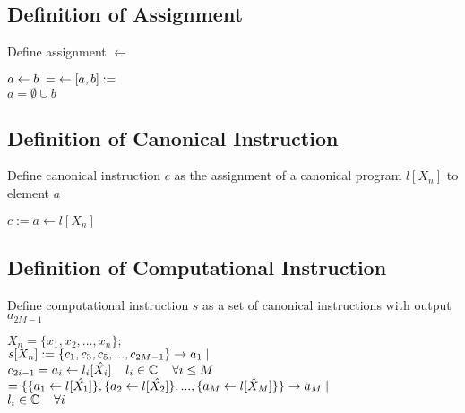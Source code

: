 \documentclass[11pt]{article}
\begin{document}
\subsection{Definition of Assignment}
Define assignment $\leftarrow$
\begin{center}
$
a \leftarrow b \hspace{1mm} = \hspace{1mm} \leftarrow[a,b] :=
$
\\ \vspace{2mm}
$
a = \emptyset \cup b
$
\end{center}





\subsection{Definition of Canonical Instruction}
Define canonical instruction $c$ as the assignment of a canonical program $l[X_n]$ to element $a$
\begin{center}
$
c := a \leftarrow l[X_n]
$
\end{center}








\subsection{Definition of Computational Instruction}
Define computational instruction $s$ as a set of canonical instructions with output $a_{2M-1}$
\begin{center}
\vspace{1mm}
$
X_n = \{x_1,x_2,...,x_n\};
$
\\ \vspace{6mm}
$
s[X_n] := \{c_1,c_3,c_5,...,c_{2M-1}\} \rightarrow a_{1} \hspace{1mm} |
$
\\ \vspace{3mm}
$
c_{2i -1}= a_i \leftarrow l_i[\hat{X_i}]  \hspace{4mm} l_i \in \mathbb{C} \hspace{4mm} \forall i \leq M
$
\\ \vspace{6mm}
$
= \{\{a_1 \leftarrow l[\hat{X_1}]\},\{a_2 \leftarrow l[\hat{X_2}]\},...,\{a_M \leftarrow l[\hat{X}_M]\}\}  \rightarrow a_M \hspace{1mm} |
$
\\ \vspace{2mm}
$
 l_i \in \mathbb{C} \hspace{4mm} \forall i
$
\end{center}
\end{document}
